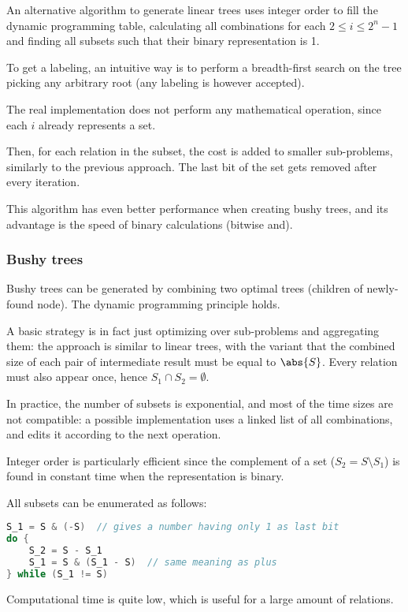 An alternative algorithm to generate linear trees uses integer order to fill the dynamic programming table, calculating all combinations for each $2 \leq i \leq 2^n-1$ and finding all subsets such that their binary representation is 1.

To get a labeling, an intuitive way is to perform a breadth-first search on the tree picking any arbitrary root (any labeling is however accepted).

The real implementation does not perform any mathematical operation, since each $i$ already represents a set. 

Then, for each relation in the subset, the cost is added to smaller sub-problems, similarly to the previous approach. The last bit of the set gets removed after every iteration.

This algorithm has even better performance when creating bushy trees, and its advantage is the speed of binary calculations (bitwise and). 

\subsubsection{Bushy trees}
Bushy trees can be generated by combining two optimal trees (children of newly-found node). The dynamic programming principle holds.

A basic strategy is in fact just optimizing over sub-problems and aggregating them: the approach is similar to linear trees, with the variant that the combined size of each pair of intermediate result must be equal to $\abs{S}$. Every relation must also appear once, hence $S_1 \cap S_2 = \emptyset$.

In practice, the number of subsets is exponential, and most of the time sizes are not compatible: a possible implementation uses a linked list of all combinations, and edits it according to the next operation.

Integer order is particularly efficient since the complement of a set ($S_2 = S \setminus S_1$) is found in constant time when the representation is binary.

All subsets can be enumerated as follows:
\begin{lstlisting}[language=C++]
S_1 = S & (-S)  // gives a number having only 1 as last bit
do {
	S_2 = S - S_1
	S_1 = S & (S_1 - S)  // same meaning as plus
} while (S_1 != S)
\end{lstlisting}
Computational time is quite low, which is useful for a large amount of relations.

